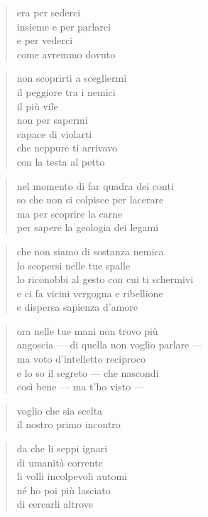 \begin{verse}
    era per sederci\\
    insieme e per parlarci\\
    e per vederci\\
    come avremmo dovuto
\end{verse}

\begin{verse}
    non scoprirti a scegliermi\\
    il peggiore tra i nemici\\
    il più vile\\
    non per sapermi\\
    capace di violarti\\
    che neppure ti arrivavo\\
    con la testa al petto
\end{verse}

\clearpage


\begin{verse}
    nel momento di far quadra dei conti\\
    so che non si colpisce per lacerare\\
    ma per scoprire la carne\\
    per sapere la geologia dei legami
\end{verse}

\begin{verse}
    che non siamo di sostanza nemica\\
    lo scopersi nelle tue spalle\\
    lo riconobbi al gesto con cui ti schermivi\\
    e ci fa vicini vergogna e ribellione\\
    e dispersa sapienza d'amore
\end{verse}

\begin{verse}
    ora nelle tue mani non trovo più\\
    angoscia — di quella non voglio parlare —\\
    ma voto d'intelletto reciproco\\
    e lo so il segreto — che nascondi\\
    così bene — ma t'ho visto —
\end{verse}

\begin{verse}
    voglio che sia scelta\\
    il nostro primo incontro
\end{verse}

\clearpage


\begin{verse}
    da che li seppi ignari\\
    di umanità corrente\\
    li volli incolpevoli automi\\
    né ho poi più lasciato\\
    di cercarli altrove
\end{verse}
